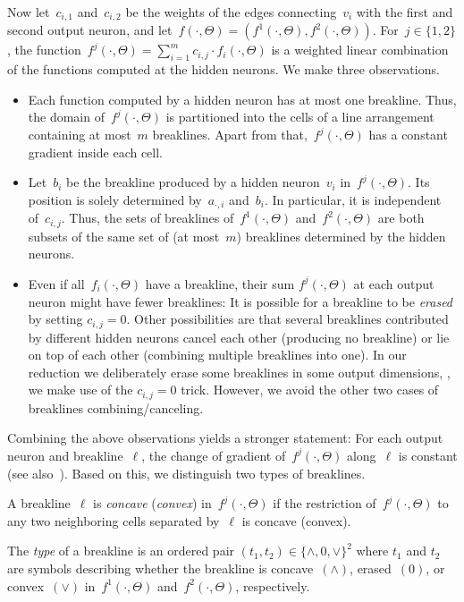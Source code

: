\documentclass{toc}
\begin{document}
Now let~$c_{i,1}$ and~$c_{i,2}$ be the weights of the edges connecting~$v_i$ with the first and second output neuron, and let~$f(\cdot, \Theta) = (f^1(\cdot, \Theta), f^2(\cdot, \Theta))$.
For~$j \in \{1,2\}$, the function~$f^j(\cdot, \Theta) = \sum_{i = 1}^m c_{i,j} \cdot f_i(\cdot, \Theta)$ is a weighted linear combination of the functions computed at the hidden neurons.
We make three observations.

\begin{itemize}
    \item Each function computed by a hidden \ReLU neuron has at most one breakline.
    Thus, the domain of~$f^j(\cdot, \Theta)$ is partitioned into the cells of a line arrangement containing at most~$m$ breaklines.
    Apart from that,~$f^j(\cdot, \Theta)$ has a constant gradient inside each cell.

    \item Let~$b_i$ be the breakline produced by a hidden neuron~$v_i$ in~$f^j(\cdot, \Theta)$.
    Its position is solely determined by~$a_{\cdot,i}$ and~$b_i$.
    In particular, it is independent of~$c_{i,j}$.
    Thus, the sets of breaklines of~$f^1(\cdot, \Theta)$ and~$f^2(\cdot, \Theta)$ are both subsets of the same set of (at most~$m$) breaklines determined by the hidden neurons.

    \item Even if all~$f_i(\cdot, \Theta)$ have a breakline, their sum $f^j(\cdot, \Theta)$ at each output neuron might have fewer breaklines:
    It is possible for a breakline to be \emph{erased} by setting $c_{i,j} = 0$.
    Other possibilities are that several breaklines contributed by different hidden neurons cancel each other (producing no breakline) or lie on top of each other (combining multiple breaklines into one).
    In our reduction we deliberately erase some breaklines in some output dimensions, \ie, we make use of the $c_{i,j} = 0$ trick.
    However, we avoid the other two cases of breaklines combining/canceling.
\end{itemize}

Combining
the  %
above observations yields a stronger statement:
For each output neuron and breakline~$\ell$, the change of gradient of~$f^j(\cdot, \Theta)$ 
along~$\ell$ is constant (see also~\cite{Dereich2022_Minimal}).
Based on this, we distinguish two types of breaklines.

\begin{definition}
    A breakline~$\ell$ is \emph{concave} (\emph{convex}) in~$f^j(\cdot,\Theta)$ if the restriction of~$f^j(\cdot,\Theta)$ to any two neighboring cells separated by~$\ell$ is concave (convex).

    The \emph{type} of a breakline is %
an ordered pair  %
$(t_1,t_2) \in \{\wedge, 0, \vee\}^2$  
where $t_1$ and $t_2$ are symbols %
%
describing  whether the breakline is concave~$(\wedge)$, erased~$(0)$, 
or convex~$(\vee)$ in~$f^1(\cdot,\Theta)$ and~$f^2(\cdot,\Theta)$, respectively.
\end{definition}    %
\end{document}
